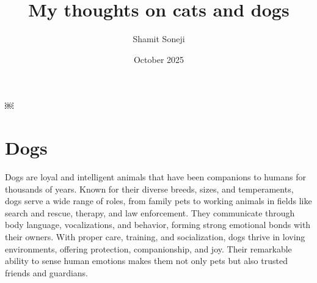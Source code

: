 \documentclass{article}
\title{My thoughts on cats and dogs}
\author{Shamit Soneji}
\date{October 2025}
\begin{document}
￼
\maketitle

\section{Dogs}

Dogs are loyal and intelligent animals that have been companions to humans for thousands of years. Known for their diverse breeds, sizes, and temperaments, dogs serve a wide range of roles, from family pets to working animals in fields like search and rescue, therapy, and law enforcement. They communicate through body language, vocalizations, and behavior, forming strong emotional bonds with their owners. With proper care, training, and socialization, dogs thrive in loving environments, offering protection, companionship, and joy. Their remarkable ability to sense human emotions makes them not only pets but also trusted friends and guardians.
\end{document}
